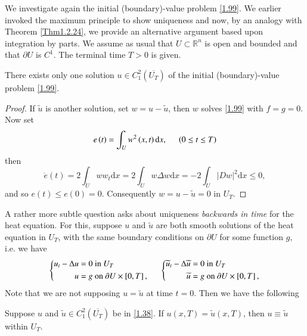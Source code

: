 We investigate again the initial (boundary)-value problem \eqref{1.99}. We earlier invoked the maximum principle to show uniqueness and now, by an analogy with Theorem \ref{Thm1.2.24}, we provide an alternative argument based upon integration by parts. We assume as usual that $U\subset\mathbb{R}^n$ is open and bounded and that $\partial U$ is $C^1$. The terminal time $T>0$ is given.
\begin{theorem}
There exists only one solution $u\in C_1^2(\overline{U_T})$ of the initial (boundary)-value problem \eqref{1.99}.
\end{theorem}
\begin{proof}
If $\widetilde{u}$ is another solution, set $w=u-\widetilde{u}$, then $w$ solves \eqref{1.99} with $f=g=0$. Now set 
$$
e\left( t \right) =\int_U{w^2\left( x,t \right) \mathrm{d}x},\hspace{0.5cm}\left( 0\le t\le T \right) 
$$
then 
$$
\dot{e}\left( t \right) =2\int_U{ww_t\mathrm{d}x}=2\int_U{w\Delta w\mathrm{d}x}=-2\int_U{\left| Dw \right|^2\mathrm{d}x}\le 0,
$$
and so $e(t)\le e(0)=0$. Consequently $w=u-\widetilde{u}=0$ in $U_T$.
\end{proof}
A rather more subtle question asks about uniqueness \textit{backwards in time} for the heat equation. For this, suppose $u$ and $\widetilde{u}$ are both smooth solutions of the heat equation in $U_T$, with the same boundary conditions on $\partial U$ for some function $g$, i.e. we have 
\begin{equation}\label{1.38}
\left\{ \begin{aligned}
	u_t-\Delta u&=0\ \text{in}\ U_T\\
	u&=g\ \text{on}\ \partial U\times \left[ 0,T \right] ,\\
\end{aligned} \right. \hspace{0.5cm}\left\{ \begin{aligned}
	\widetilde{u}_t-\Delta \widetilde{u}&=0\ \text{in}\ U_T\\
	\widetilde{u}&=g\ \text{on}\ \partial U\times \left[ 0,T \right] ,\\
\end{aligned} \right. 
\end{equation}
Note that we are not supposing $u=\widetilde{u}$ at time $t=0$. Then we have the following 
\begin{theorem}
Suppose $u$ and $\widetilde{u}\in C_1^2(\overline{U_T})$ be in \eqref{1.38}. If $u(x,T)=\widetilde{u}(x,T)$, then $u\equiv\widetilde{u}$ within $U_T$.
\end{theorem}
